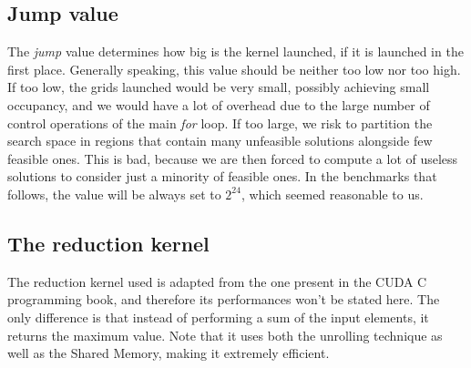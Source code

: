 \documentclass[12pt]{extarticle}
\begin{document}
 \subsection{Jump value}
 The \emph{jump} value determines how big is the kernel launched, if it is launched in the first place. Generally speaking, this value should be neither too low nor too high. If too low, the grids launched would be very small, possibly achieving small occupancy, and we would have a lot of overhead due to the large number of control operations of the main \emph{for} loop. If too large, we risk to partition the search space in regions that contain many unfeasible solutions alongside few feasible ones. This is bad, because we are then forced to compute a lot of useless solutions to consider just a minority of feasible ones. In the benchmarks that follows, the value will be always set to $2^{24}$, which seemed reasonable to us.
 \subsection{The reduction kernel}
 The reduction kernel used is adapted from the one present in the CUDA C programming book\cite{cuda_c_programming:textbook}, and therefore its performances won't be stated here. The only difference is that instead of performing a sum of the input elements, it returns the maximum value. Note that it uses both the unrolling technique as well as the Shared Memory, making it extremely efficient.
 
\end{document}
